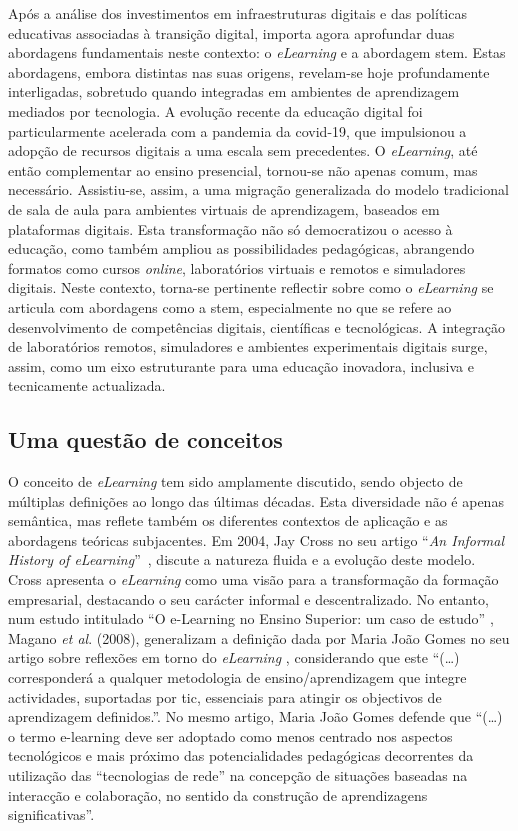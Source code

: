 Após a análise dos investimentos em infraestruturas digitais e das políticas educativas associadas à transição digital, importa agora aprofundar duas abordagens fundamentais neste contexto: o \textit{eLearning} e a abordagem \acrshort{stem}. Estas abordagens, embora distintas nas suas origens, revelam-se hoje profundamente interligadas, sobretudo quando integradas em ambientes de aprendizagem mediados por tecnologia. A evolução recente da educação digital foi particularmente acelerada com a pandemia da \acrshort{covid-19}, que impulsionou a adopção de recursos digitais a uma escala sem precedentes. O \textit{eLearning}, até então complementar ao ensino presencial, tornou-se não apenas comum, mas necessário. Assistiu-se, assim, a uma migração generalizada do modelo tradicional de sala de aula para ambientes virtuais de aprendizagem, baseados em plataformas digitais. Esta transformação não só democratizou o acesso à educação, como também ampliou as possibilidades pedagógicas, abrangendo formatos como cursos \textit{online}, laboratórios virtuais e remotos e simuladores digitais. Neste contexto, torna-se pertinente reflectir sobre como o \textit{eLearning} se articula com abordagens como a \acrshort{stem}, especialmente no que se refere ao desenvolvimento de competências digitais, científicas e tecnológicas. A integração de laboratórios remotos, simuladores e ambientes experimentais digitais surge, assim, como um eixo estruturante para uma educação inovadora, inclusiva e tecnicamente actualizada.

\subsection{Uma questão de conceitos}
O conceito de \textit{eLearning} tem sido amplamente discutido, sendo objecto de múltiplas definições ao longo das últimas décadas. Esta diversidade não é apenas semântica, mas reflete também os diferentes contextos de aplicação e as abordagens teóricas subjacentes. Em 2004, Jay Cross no seu artigo ``\textit{An Informal History of eLearning}''~\cite{jaycross}, discute a natureza fluida e a evolução deste modelo. Cross apresenta o \textit{eLearning} como uma visão para a transformação da formação empresarial, destacando o seu carácter informal e descentralizado.  No entanto, num estudo intitulado ``O e-Learning no Ensino Superior: um caso de estudo'' \cite{eLearningenssup}, Magano \textit{et al}. (2008), generalizam a definição dada por Maria João Gomes no seu artigo sobre reflexões em torno do \textit{eLearning} \cite{gomes_e-learning_2005}, considerando que este ``(\ldots) corresponderá a qualquer metodologia de ensino/aprendizagem que integre actividades, suportadas por \acrshort{tic}, essenciais para atingir os objectivos de aprendizagem definidos.''. No mesmo artigo, Maria João Gomes defende que ``(\ldots) o termo e-learning deve ser adoptado como menos centrado nos aspectos tecnológicos e mais próximo das potencialidades pedagógicas decorrentes da utilização das ``tecnologias de rede'' na concepção de situações baseadas na interacção e colaboração, no sentido da construção de aprendizagens significativas''.

